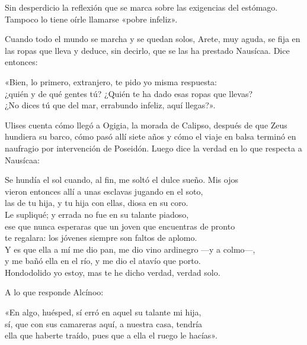 Sin desperdicio la reflexión que se marca sobre las exigencias del estómago. Tampoco lo tiene oírle llamarse «pobre infeliz».

Cuando todo el mundo se marcha y se quedan solos, Arete, muy aguda, se fija en las ropas que lleva y deduce, sin decirlo, que se las ha prestado Nausícaa. Dice entonces:

\begin{versocita}
«Bien, lo primero, extranjero, te pido yo misma respuesta:\\
¿quién y de qué gentes tú? ¿Quién te ha dado esas ropas que llevas?\\
¿No dices tú que del mar, errabundo infeliz, aquí llegas?».
\end{versocita}

Ulises cuenta cómo llegó a Ogigia, la morada de Calipso, después de que Zeus hundiera su barco, cómo pasó allí siete años y cómo el viaje en balsa terminó en naufragio por intervención de Poseidón. Luego dice la verdad en lo que respecta a Nausícaa:

\begin{versocita}
Se hundía el sol cuando, al fin, me soltó el dulce sueño. Mis ojos\\
vieron entonces allí a unas esclavas jugando en el soto,\\
las de tu hija, y tu hija con ellas, diosa en su coro.\\
Le supliqué; y errada no fue en su talante piadoso,\\
ese que nunca esperaras que un joven que encuentras de pronto\\
te regalara: los jóvenes siempre son faltos de aplomo.\\
Y es que ella a mí me dio pan, me dio vino ardinegro ---y a colmo---,\\
y me bañó ella en el río, y me dio el atavío que porto.\\
Hondodolido yo estoy, mas te he dicho verdad, verdad solo.
\end{versocita}

A lo que responde Alcínoo:

\begin{versocita}
«En algo, huésped, sí erró en aquel su talante mi hija,\\
sí, que con sus camareras aquí, a nuestra casa, tendría\\
ella que haberte traído, pues que a ella el ruego le hacías».
\end{versocita}

